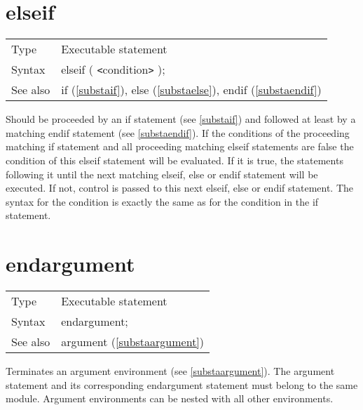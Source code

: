  
\section{elseif}
\label{substaelseif}

\noindent \begin{tabular}{ll}
Type & Executable statement\\
Syntax & elseif ( {\tt<}condition{\tt>} );
\\ See also & if (\ref{substaif}),
              else (\ref{substaelse}),
              endif (\ref{substaendif})
\end{tabular} \vspace{4mm}

\noindent Should be proceeded by an if 
statement (see \ref{substaif}) and followed at least by a matching 
endif 
statement (see \ref{substaendif}). If the conditions of the proceeding 
matching if statement and all proceeding matching
elseif statements are false the 
condition of this elseif statement will be evaluated. If it is true, the 
statements following it until the next matching elseif,
else or endif statement will be executed. 
If not, control is passed to this next elseif, else or endif statement. The 
syntax for the condition is exactly the same as for the condition in the if 
statement. \vspace{10mm}
 

\section{endargument}
\label{substaendargument}

\noindent \begin{tabular}{ll}
Type & Executable statement\\
Syntax & endargument; \\
See also & argument (\ref{substaargument})
\end{tabular} \vspace{4mm}

\noindent Terminates an argument environment 
(see \ref{substaargument}). The argument statement and its 
corresponding endargument statement must belong to the 
same module. Argument environments can be nested with all other 
environments. \vspace{10mm}

